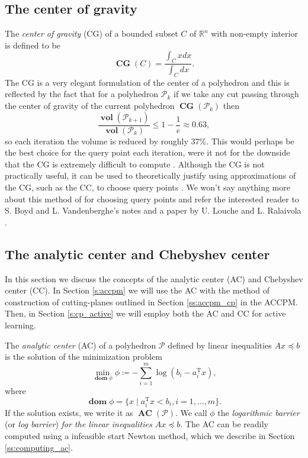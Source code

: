 \documentclass[11pt]{amsart}
\theoremstyle{definition}
\theoremstyle{remark}
\newcommand{\transpose}{\text{T}}
\DeclareMathOperator{\domain}{\textbf{dom}}
\DeclareMathOperator{\CG}{\textbf{CG}}
\DeclareMathOperator{\vol}{\textbf{vol}}
\DeclareMathOperator{\AC}{\textbf{AC}}
\begin{document}
    \subsection{The center of gravity}
        The \emph{center of gravity} (CG) of a bounded subset $C$ of $\mathbb{R}^n$ with non-empty interior is defined to be
        \begin{equation*}
            \CG(C) = \frac{\int_C x dx}{\int_C dx}.
        \end{equation*}
        The CG is a very elegant formulation of the center of a polyhedron and this is reflected by the fact \cite[Section 4.2]{BV11} that for a polyhedron $\mathcal{P}_k$ if we take any cut passing through the center of gravity of the current polyhedron $\CG(\mathcal{P}_k)$ then
        \begin{equation*}
            \frac{\vol(\mathcal{P}_{k+1})}{\vol(\mathcal{P}_k)} \leq 1 - \frac{1}{e} \approx 0.63,
        \end{equation*}
        so each iteration the volume is reduced by roughly $37\%$. This would perhaps be the best choice for the query point each iteration, were it not for the downside that the CG is extremely difficult to compute \cite[Section 4.2]{BV11}. Although the CG is not practically useful, it can be used to theoretically justify using approximations of the CG, such as the CC, to choose query points \cite[Section II.C]{LR15}. We won't say anything more about this method of for choosing query points and refer the interested reader to S. Boyd and L. Vandenberghe's  notes \cite[Section 4.2]{BV11} and a paper by U. Louche and L. Ralaivola \cite[Section II.C]{LR15}. 

    \subsection{The analytic center and Chebyshev center}
        In this section we discuss the concepts of the analytic center (AC) and Chebyshev center (CC). In Section \ref{s:accpm} we will use the AC with the method of construction of cutting-planes outlined in Section \ref{ss:accpm_cp} in the ACCPM. Then, in Section \ref{s:cp_active} we will employ both the AC and CC for active learning. 

        The \emph{analytic center} (AC) of a polyhedron $\mathcal{P}$ defined by linear inequalities $Ax \preceq b$ is the solution of the minimization problem
        \begin{equation}\label{e:log_barrier_problem}
            \min_{\domain \phi} \phi \coloneqq - \sum_{i=1}^{m}{\log{(b_i - a_i^\transpose x)}},
        \end{equation}        
        where
        \begin{equation*}
            \domain \phi = \{x \;|\; a_i^\transpose x < b_i, i = 1, \dots, m\}.
        \end{equation*}
        If the solution exists, we write it as $\AC(\mathcal{P})$. We call $\phi$ the \emph{logarithmic barrier} (or \emph{log barrier}) \emph{for the linear inequalities $Ax \preceq b$}. The AC can be readily computed using a infeasible start Newton method, which we describe in Section \ref{ss:computing_ac}. 
\end{document}
